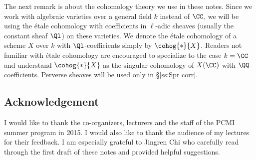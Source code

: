 The next remark is about the cohomology theory we use in these notes. Since we work with algebraic varieties over a general field $k$ instead of $\CC$, we will be using the \'etale cohomology with coefficients in $\ell$-adic sheaves (usually the constant sheaf $\Ql$) on these varieties. We denote the \'etale cohomology of a scheme $X$ over $k$ with $\Ql$-coefficients simply by $\cohog{*}{X}$. Readers not familiar with \'etale cohomology are encouraged to specialize to the case $k=\CC$ and understand $\cohog{*}{X}$ as the singular cohomology of $X(\CC)$ with $\QQ$-coefficients. Perverse sheaves will be used only in \S\ref{ss:Spr corr}.


\subsection*{Acknowledgement} I would like to thank the co-organizers, lecturers and the staff of the PCMI summer program in 2015. I would also like to thank the audience of my lectures for their feedback. I am especially grateful to Jingren Chi who carefully read through the first draft of these notes and provided helpful suggestions.

